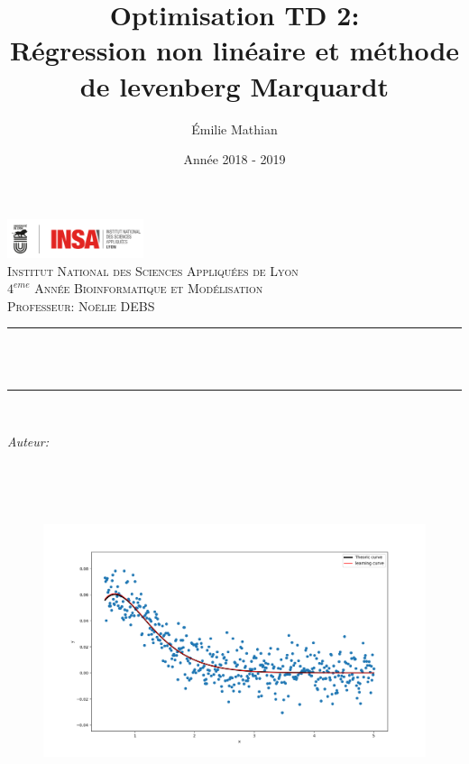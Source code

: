 \documentclass[12pt]{article}
\title{\color{brick} Optimisation TD 2:\\
\LARGE{Régression non linéaire et méthode de levenberg Marquardt}}								%
\author{Émilie Mathian}								%
\date{Année 2018 - 2019}											%
\makeatletter
\let\thetitle\@title
\let\theauthor\@author
\let\thedate\@date
\makeatother
\begin{document}

\begin{titlepage}
	\centering
    \vspace*{0.5 cm}
    \vspace{-3.5cm}
    \includegraphics[width = 4cm]{logo.png}\\	%
    \textsc{\LARGE Institut National des Sciences Appliquées de Lyon}\\[2.0 cm]	%
	\textsc{\Large $4^{eme}$ Année Bioinformatique et Modélisation}\\[0.5 cm]				%
	\textsc{\large Professeur: Noëlie DEBS }\\[0.5 cm]				%
	\rule{\linewidth}{0.2 mm} \\[0.4 cm]
	{ \huge \bfseries \thetitle}\\
	\rule{\linewidth}{0.2 mm} \\[1.5 cm]
	
	\begin{minipage}{0.4\textwidth}
		\begin{flushleft} \large
			\emph{Auteur:}
			\theauthor
			\end{flushleft}
			\end{minipage}~
			\begin{minipage}{0.4\textwidth}	
	\end{minipage}\\[2 cm]
    \vspace{-1.8cm}
	 \begin{figure}[H]
	\begin{center}
	\includegraphics[width=0.65 \textwidth]{Figure_1.png}
\end{center}
\end{figure}

	{\large \thedate}\\[1 cm]
    
	\vfill

 

\end{titlepage}
\pagebreak
\end{document}

